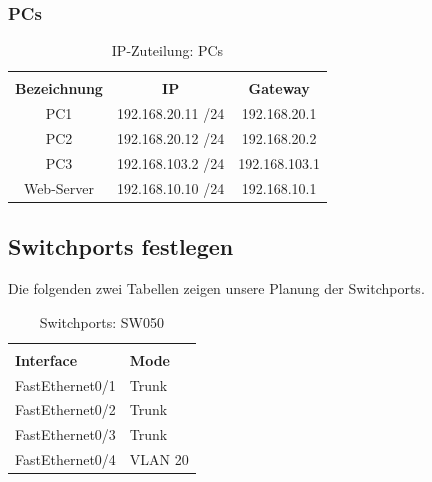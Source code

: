 \documentclass[a4paper, ngerman]{article}
\begin{document}
\subsubsection{PCs}

\begin{table}[H]
    \caption{IP-Zuteilung: PCs} %
    \centering %
    \begin{tabular}{c c c} %
        \hline\hline
        \\
        \textbf{Bezeichnung} & \textbf{IP}       & \textbf{Gateway} \\ [0.5ex]
        \hline
        PC1                  & 192.168.20.11 /24 & 192.168.20.1     \\ %
        PC2                  & 192.168.20.12 /24 & 192.168.20.2     \\
        PC3                  & 192.168.103.2 /24 & 192.168.103.1    \\
        Web-Server           & 192.168.10.10 /24 & 192.168.10.1     \\ [1ex]
        \hline
    \end{tabular}
    \label{table:nonlin} %
\end{table}

\subsection{Switchports festlegen}
Die folgenden zwei Tabellen zeigen unsere Planung der Switchports.
\begin{table}[H]
    \caption{Switchports: SW050} %
    \centering %
    \begin{tabular}{l l} %
        \hline\hline
        \\
        \textbf{Interface} & \textbf{Mode} \\ [0.5ex]
        \hline
        FastEthernet0/1    & Trunk         \\ %
        FastEthernet0/2    & Trunk         \\
        FastEthernet0/3    & Trunk         \\
        FastEthernet0/4    & VLAN 20       \\ [1ex]
        \hline
    \end{tabular}
    \label{table:nonlin} %
\end{table}
\end{document}
